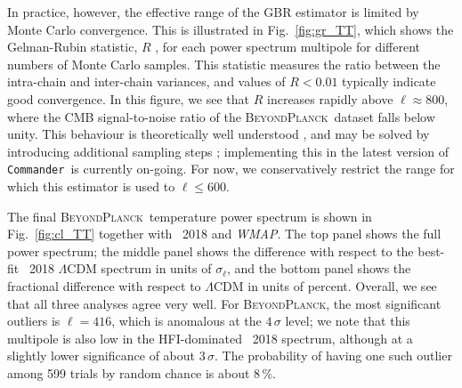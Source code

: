 \documentclass[twocolumn]{aa}
\def\WMAP{\textit{WMAP}}
\def\commander{\texttt{Commander}}
\newcommand{\BP}{\textsc{BeyondPlanck}}
\begin{document}
In practice, however, the effective range of the GBR estimator is
limited by Monte Carlo convergence. This is illustrated in
Fig.~\ref{fig:gr_TT}, which shows the Gelman-Rubin statistic, $R$
\citep{gelman:1992}, for each power spectrum multipole for different
numbers of Monte Carlo samples. This statistic measures the ratio
between the intra-chain and inter-chain variances, and values of
$R<0.01$ typically indicate good convergence. In this figure, we see
that $R$ increases rapidly above $\ell\approx 800$, where the CMB
signal-to-noise ratio of the \BP\ dataset falls below unity. This
behaviour is theoretically well understood
\citep[e.g.,][]{eriksen:2004}, and may be solved by introducing
additional sampling steps \citep{jewell:2009,racine:2016};
implementing this in the latest version of \commander\ is currently
on-going. For now, we conservatively restrict the range for which this
estimator is used to $\ell\le600$.

The final \BP\ temperature power spectrum is shown in
Fig.~\ref{fig:cl_TT} together with \Planck\ 2018 and \WMAP. The top
panel shows the full power spectrum; the middle panel shows the
difference with respect to the best-fit \Planck\ 2018 $\Lambda$CDM
spectrum in units of $\sigma_{\ell}$, and the bottom panel shows the
fractional difference with respect to $\Lambda$CDM in units of
percent. Overall, we see that all three analyses agree very well. For
\BP, the most significant outliers is $\ell=416$, which is anomalous
at the $4\,\sigma$ level; we note that this multipole is also low in
the HFI-dominated \Planck\ 2018 spectrum, although at a slightly lower
significance of about $3\,\sigma$. The probability of having one such
outlier among 599 trials by random chance is about 8\,\%.
\end{document}
